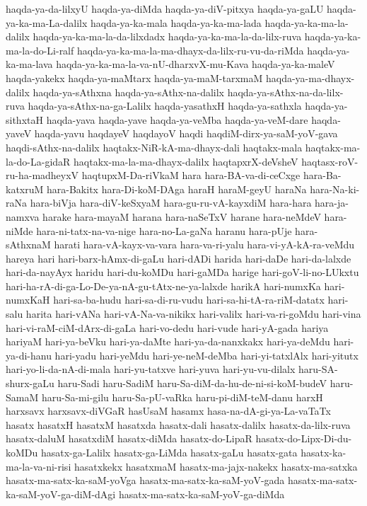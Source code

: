 {haqda-ya-da-lilxyU
haqda-ya-diMda
haqda-ya-diV-pitxya
haqda-ya-gaLU
haqda-ya-ka-ma-La-dalilx
haqda-ya-ka-mala
haqda-ya-ka-ma-lada
haqda-ya-ka-ma-la-dalilx
haqda-ya-ka-ma-la-da-lilxdadx
haqda-ya-ka-ma-la-da-lilx-ruva
haqda-ya-ka-ma-la-do-Li-ralf
haqda-ya-ka-ma-la-ma-dhayx-da-lilx-ru-vu-da-riMda
haqda-ya-ka-ma-lava
haqda-ya-ka-ma-la-va-nU-dharxvX-mu-Kava
haqda-ya-ka-maleV
haqda-yakekx
haqda-ya-maMtarx
haqda-ya-maM-tarxmaM
haqda-ya-ma-dhayx-dalilx
haqda-ya-sAthxna
haqda-ya-sAthx-na-dalilx
haqda-ya-sAthx-na-da-lilx-ruva
haqda-ya-sAthx-na-ga-Lalilx
haqda-yasathxH
haqda-ya-sathxla
haqda-ya-sithxtaH
haqda-yava
haqda-yave
haqda-ya-veMba
haqda-ya-veM-dare
haqda-yaveV
haqda-yavu
haqdayeV
haqdayoV
haqdi
haqdiM-dirx-ya-saM-yoV-gava
haqdi-sAthx-na-dalilx
haqtakx-NiR-kA-ma-dhayx-dali
haqtakx-mala
haqtakx-ma-la-do-La-gidaR
haqtakx-ma-la-ma-dhayx-dalilx
haqtapxrX-deVsheV
haqtasx-roV-ru-ha-madheyxV
haqtupxM-Da-riVkaM
hara
hara-BA-va-di-ceCxge
hara-Ba-katxruM
hara-Bakitx
hara-Di-koM-DAga
haraH
haraM-geyU
haraNa
hara-Na-ki-raNa
hara-biVja
hara-diV-keSxyaM
hara-gu-ru-vA-kayxdiM
hara-hara
hara-ja-namxva
harake
hara-mayaM
harana
hara-naSeTxV
harane
hara-neMdeV
hara-niMde
hara-ni-tatx-na-va-nige
hara-no-La-gaNa
haranu
hara-pUje
hara-sAthxnaM
harati
hara-vA-kayx-va-vara
hara-va-ri-yalu
hara-vi-yA-kA-ra-veMdu
hareya
hari
hari-barx-hAmx-di-gaLu
hari-dADi
harida
hari-daDe
hari-da-lalxde
hari-da-nayAyx
haridu
hari-du-koMDu
hari-gaMDa
harige
hari-goV-li-no-LUkxtu
hari-ha-rA-di-ga-Lo-De-ya-nA-gu-tAtx-ne-ya-lalxde
harikA
hari-numxKa
hari-numxKaH
hari-sa-ba-hudu
hari-sa-di-ru-vudu
hari-sa-hi-tA-ra-riM-datatx
hari-salu
harita
hari-vANa
hari-vA-Na-va-nikikx
hari-valilx
hari-va-ri-goMdu
hari-vina
hari-vi-raM-ciM-dArx-di-gaLa
hari-vo-dedu
hari-vude
hari-yA-gada
hariya
hariyaM
hari-ya-beVku
hari-ya-daMte
hari-ya-da-nanxkakx
hari-ya-deMdu
hari-ya-di-hanu
hari-yadu
hari-yeMdu
hari-ye-neM-deMba
hari-yi-tatxlAlx
hari-yitutx
hari-yo-li-da-nA-di-mala
hari-yu-tatxve
hari-yuva
hari-yu-vu-dilalx
haru-SA-shurx-gaLu
haru-Sadi
haru-SadiM
haru-Sa-diM-da-hu-de-ni-si-koM-budeV
haru-SamaM
haru-Sa-mi-gilu
haru-Sa-pU-vaRka
haru-pi-diM-teM-danu
harxH
harxsavx
harxsavx-diVGaR
hasUsaM
hasamx
hasa-na-dA-gi-ya-La-vaTaTx
hasatx
hasatxH
hasatxM
hasatxda
hasatx-dali
hasatx-dalilx
hasatx-da-lilx-ruva
hasatx-daluM
hasatxdiM
hasatx-diMda
hasatx-do-LipaR
hasatx-do-Lipx-Di-du-koMDu
hasatx-ga-Lalilx
hasatx-ga-LiMda
hasatx-gaLu
hasatx-gata
hasatx-ka-ma-la-va-ni-risi
hasatxkekx
hasatxmaM
hasatx-ma-jajx-nakekx
hasatx-ma-satxka
hasatx-ma-satx-ka-saM-yoVga
hasatx-ma-satx-ka-saM-yoV-gada
hasatx-ma-satx-ka-saM-yoV-ga-diM-dAgi
hasatx-ma-satx-ka-saM-yoV-ga-diMda
}
